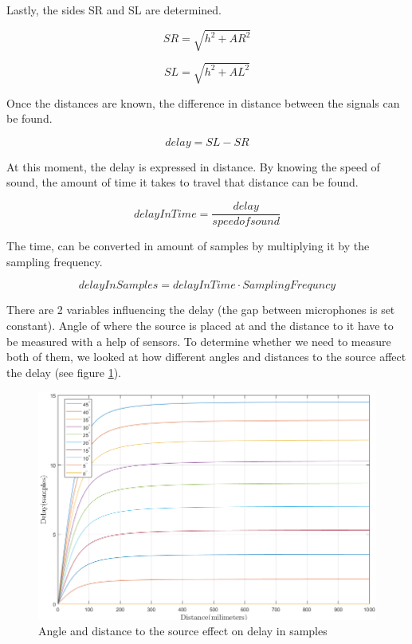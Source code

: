 \newpage
Lastly, the sides SR and SL are determined.

\begin{equation}
	SR = \sqrt{h^2 + AR^2}
\end{equation}

\begin{equation}
	SL = \sqrt{h^2 + AL^2}
\end{equation}

Once the distances are known, the difference in distance between the signals can be found.

\begin{equation}
	delay = SL - SR
\end{equation}

At this moment, the delay is expressed in distance. By knowing the speed of sound, the amount of
time it takes to travel that distance can be found.

\begin{equation}
	delayInTime = \frac{delay}{speed  of  sound}
\end{equation}

The time, can be converted in amount of samples by multiplying it by the sampling frequency.

\begin{equation}
	delayInSamples = delayInTime \cdot SamplingFrequncy
\end{equation}

There are 2 variables influencing the delay (the gap between microphones is 
set constant). Angle of where the source is placed at and the distance to it have 
to be measured with a help of sensors. To determine whether we need to measure both 
of them, we looked at how different angles and distances to the source affect the 
delay (see figure \ref{fig:anglesDistDelay}).

\begin{figure}[htp]
	\centering
	\includegraphics[width=1\textwidth]{Illustrations/distanceMatters.png}
	\caption{Angle and distance to the source effect on delay in samples}
	\label{fig:anglesDistDelay}
\end{figure}

